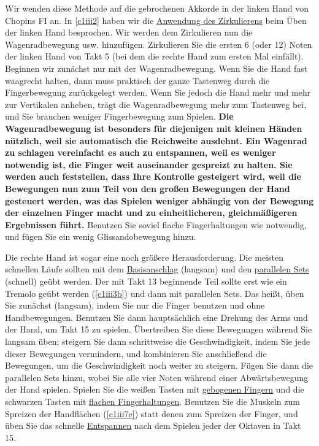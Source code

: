 Wir wenden diese Methode auf die gebrochenen Akkorde in der linken Hand von Chopins FI an.
In \autoref{c1iii2} haben wir die \hyperref[c1iii2]{Anwendung des Zirkulierens} beim Üben der linken Hand besprochen.
Wir werden dem Zirkulieren nun die Wagenradbewegung usw. hinzufügen.
Zirkulieren Sie die ersten 6 (oder 12) Noten der linken Hand von Takt 5 (bei dem die rechte Hand zum ersten Mal einfällt).
Beginnen wir zunächst nur mit der Wagenradbewegung.
Wenn Sie die Hand fast waagrecht halten, dann muss praktisch der ganze Tastenweg durch die Fingerbewegung zurückgelegt werden.
Wenn Sie jedoch die Hand mehr und mehr zur Vertikalen anheben, trägt die Wagenradbewegung mehr zum Tastenweg bei, und Sie brauchen weniger Fingerbewegung zum Spielen.
\textbf{Die Wagenradbewegung ist besonders für diejenigen mit kleinen Händen nützlich, weil sie automatisch die Reichweite ausdehnt.
Ein Wagenrad zu schlagen vereinfacht es auch zu entspannen, weil es weniger notwendig ist, die Finger weit auseinander gespreizt zu halten.
Sie werden auch feststellen, dass Ihre Kontrolle gesteigert wird, weil die Bewegungen nun zum Teil von den großen Bewegungen der Hand gesteuert werden, was das Spielen weniger abhängig von der Bewegung der einzelnen Finger macht und zu einheitlicheren, gleichmäßigeren Ergebnissen führt.}
Benutzen Sie soviel flache Fingerhaltungen wie notwendig, und fügen Sie ein wenig Glissandobewegung hinzu.  


Die rechte Hand ist sogar eine noch größere Herausforderung.
Die meisten schnellen Läufe sollten mit dem \hyperref[c1iii1a1]{Basisanschlag} (langsam) und den \hyperref[c1ii11]{parallelen Sets} (schnell) geübt werden.
Der mit Takt 13 beginnende Teil sollte erst wie ein Tremolo geübt werden (\hyperref[c1iii3b]{\autoref{c1iii3b}}) und dann mit parallelen Sets.
Das heißt, üben Sie zunächst (langsam), indem Sie nur die Finger benutzen und ohne Handbewegungen.
Benutzen Sie dann hauptsächlich eine Drehung des Arms und der Hand, um Takt 15 zu spielen.
Übertreiben Sie diese Bewegungen während Sie langsam üben; steigern Sie dann schrittweise die Geschwindigkeit, indem Sie jede dieser Bewegungen vermindern, und kombinieren Sie anschließend die Bewegungen, um die Geschwindigkeit noch weiter zu steigern.
Fügen Sie dann die parallelen Sets hinzu, wobei Sie alle vier Noten während einer Abwärtsbewegung der Hand spielen.
Spielen Sie die weißen Tasten mit \hyperref[c1ii2]{gebogenen Fingern} und die schwarzen Tasten mit \hyperref[c1iii4b]{flachen Fingerhaltungen}.
Benutzen Sie die Muskeln zum Spreizen der Handflächen (\hyperref[c1iii7e]{\autoref{c1iii7e}}) statt denen zum Spreizen der Finger, und üben Sie das schnelle \hyperref[c1ii14]{Entspannen} nach dem Spielen jeder der Oktaven in Takt 15.

